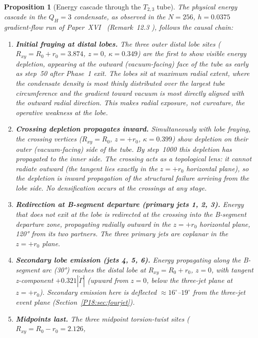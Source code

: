 \documentclass[11pt,a4paper]{article}
\newtheorem{proposition}[theorem]{Proposition}
\theoremstyle{definition}\newtheorem{definition}[theorem]{Definition}
\theoremstyle{remark}
\newcommand{\QH}{Q_H}
\begin{document}
\begin{proposition}[Energy cascade through the $T_{2,3}$ tube]
\label{P18:prop:cascade_p18}
The physical energy cascade in the $\QH=3$ condensate, as observed in
the $N=256$, $h=0.0375$ gradient-flow run of Paper~XVI~\cite{Paper16}
(Remark~12.3%
), follows the causal chain:
\begin{enumerate}[noitemsep,label=(\roman*)]
\item \textbf{Initial fraying at distal lobes.}
  The three outer distal lobe sites ($R_{xy}=R_0+r_0=3.874$, $z=0$,
  $\kappa=0.349$) are the first to show visible energy depletion,
  appearing at the outward (vacuum-facing) face of the tube as early
  as step~50 after Phase~1 exit.  The lobes sit at maximum radial
  extent, where the condensate density is most thinly distributed
  over the largest tube circumference and the gradient toward vacuum is
  most directly aligned with the outward radial direction.  This makes
  radial exposure, not curvature, the operative weakness at the lobe.
\item \textbf{Crossing depletion propagates inward.}
  Simultaneously with lobe fraying, the crossing vertices
  ($R_{xy}=R_0$, $z=+r_0$, $\kappa=0.399$) show depletion on their
  outer (vacuum-facing) side of the tube.  By step~1000 this depletion
  has propagated to the inner side.  The crossing acts as a
  \emph{topological lens}: it cannot radiate outward (the tangent lies
  exactly in the $z=+r_0$ horizontal plane), so the depletion is inward
  propagation of the structural failure arriving from the lobe side.
  No densification occurs at the crossings at any stage.
\item \textbf{Redirection at B-segment departure (primary jets 1, 2, 3).}
  Energy that does not exit at the lobe is redirected at the crossing
  into the B-segment departure zone, propagating radially outward in
  the $z=+r_0$ horizontal plane, 120° from its two partners.
  The three primary jets are coplanar in the $z=+r_0$ plane.
\item \textbf{Secondary lobe emission (jets 4, 5, 6).}
  Energy propagating along the B-segment arc (30°) reaches the distal
  lobe at $R_{xy}=R_0+r_0$, $z=0$, with tangent z-component
  $+0.321|\dot\Gamma|$ (upward from $z=0$, below the three-jet plane
  at $z=+r_0$).  Secondary emission here is deflected
  $\approx16^\circ$--$19^\circ$ from the three-jet event plane
  (Section~\ref{P18:sec:fourjet}).
\item \textbf{Midpoints last.}
  The three midpoint torsion-twist sites ($R_{xy}=R_0-r_0=2.126$,

\end{enumerate}
\end{proposition}
\end{document}
